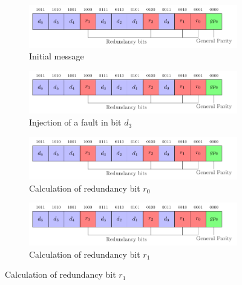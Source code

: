 \begin{figure}[ht]
    \centering
    \begin{subfigure}[b]{0.49\textwidth}
        \includegraphics[width=\textwidth, page=5]{c5_countermeasures_dift/img/secded.pdf}
        \caption{Initial message}
        \label{fig:secded_faulted_1bit_1}
    \end{subfigure}
    \hfill
    \begin{subfigure}[b]{0.49\textwidth}
        \includegraphics[width=\textwidth, page=6]{c5_countermeasures_dift/img/secded.pdf}
        \caption{Injection of a fault in bit $d_3$}
        \label{fig:secded_faulted_1bit_2}
    \end{subfigure}
    \hfill
    \begin{subfigure}[b]{0.49\textwidth}
        \includegraphics[width=\textwidth, page=7]{c5_countermeasures_dift/img/secded.pdf}
        \caption{Calculation of redundancy bit $r_0$}
        \label{fig:secded_faulted_1bit_3}
    \end{subfigure}
    \hfill
    \begin{subfigure}[b]{0.49\textwidth}
        \includegraphics[width=\textwidth, page=8]{c5_countermeasures_dift/img/secded.pdf}
        \caption{Calculation of redundancy bit $r_1$}
        \label{fig:secded_faulted_1bit_4}
    \end{subfigure}

\end{figure}
